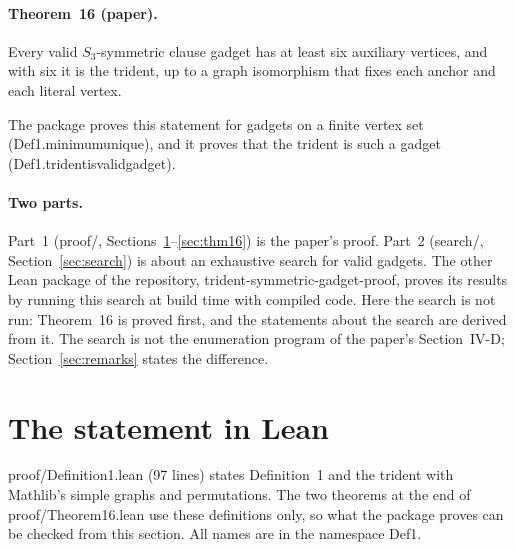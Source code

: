 \documentclass[11pt,a4paper]{article}
\newcommand{\leanus}{\textunderscore\allowbreak}
\newcommand{\lean}[1]{{\ttfamily\let\_\leanus #1}}
\begin{document}
\paragraph{Theorem~16 (paper).} Every valid $S_3$-symmetric clause gadget has
at least six auxiliary vertices, and with six it is the trident, up to a graph
isomorphism that fixes each anchor and each literal vertex.

\medskip
The package proves this statement for gadgets on a finite vertex set
(\lean{Def1.minimum\_unique}), and it proves that the trident is such a
gadget (\lean{Def1.trident\_is\_valid\_gadget}).

\paragraph{Two parts.} Part~1 (\lean{proof/},
Sections~\ref{sec:statement}--\ref{sec:thm16}) is the paper's proof. Part~2
(\lean{search/}, Section~\ref{sec:search}) is about an exhaustive search for
valid gadgets. The other Lean package of the repository,
\lean{trident-symmetric-gadget-proof}, proves its results by running this
search at build time with compiled code. Here the search is not run:
Theorem~16 is proved first, and the statements about the search are derived
from it. The search is not the enumeration program of the paper's
Section~IV-D; Section~\ref{sec:remarks} states the difference.

\section{The statement in Lean}\label{sec:statement}

\lean{proof/Definition1.lean} (97 lines) states Definition~1 and the trident
with Mathlib's simple graphs and permutations. The two theorems at the end of
\lean{proof/Theorem16.lean} use these definitions only, so what the package
proves can be checked from this section. All names are in the namespace
\lean{Def1}.
\end{document}
